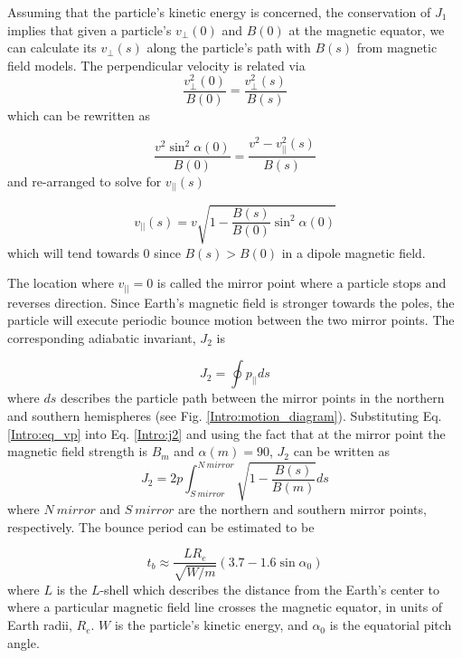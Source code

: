 Assuming that the particle's kinetic energy is concerned, the conservation of $J_1$ implies that given a particle's $v_\perp(0)$ and $B(0)$ at the magnetic equator, we can calculate its $v_\perp(s)$ along the particle's path with $B(s)$ from magnetic field models. The perpendicular velocity is related via
\begin{equation}
\frac{v_\perp^2 (0)}{B(0)} = \frac{v_\perp^2 (s)}{B(s)}
\end{equation} which can be rewritten as 

\begin{equation}
\frac{v^2 \sin^2{\alpha(0)}}{B(0)} = \frac{v^2 - v^2_{||}(s)}{B(s)}
\end{equation} and re-arranged to solve for $v_{||}(s)$

\begin{equation} \label{Intro:eq_vp} 
v_{||}(s) = v \sqrt{1 - \frac{B(s)}{B(0)} \sin^2{\alpha(0)}}
\end{equation} which will tend towards 0 since $B(s) > B(0)$ in a dipole magnetic field.

The location where $v_{||} = 0$ is called the mirror point where a particle stops and reverses direction. Since Earth's magnetic field is stronger towards the poles, the particle will execute periodic bounce motion between the two mirror points. The corresponding adiabatic invariant, $J_2$ is

\begin{equation} \label{Intro:j2}
J_2 = \oint p_{||} ds
\end{equation} where $ds$ describes the particle path between the mirror points in the northern and southern hemispheres (see Fig. \ref{Intro:motion_diagram}). Substituting Eq. \ref{Intro:eq_vp} into Eq. \ref{Intro:j2} and using the fact that at the mirror point the magnetic field strength is $B_m$ and $\alpha(m) = 90$, $J_2$ can be written as     
\begin{equation}
J_2 = 2 p \int_{S \ mirror}^{N \ mirror} \sqrt{1 - \frac{B(s)}{B(m)}} ds
\end{equation} where $N \ mirror$ and $S \ mirror$ are the northern and southern mirror points, respectively. The bounce period can be estimated \citep[e.g.][]{Baumjohann1997} to be 

\begin{equation}
t_b \approx \frac{L R_e}{\sqrt{W/m}} (3.7 - 1.6 \sin{\alpha_0})
\end{equation} where $L$ is the $L$-shell which describes the distance from the Earth's center to where a particular magnetic field line crosses the magnetic equator, in units of Earth radii, $R_e$. $W$ is the particle's kinetic energy, and $\alpha_0$ is the equatorial pitch angle.

